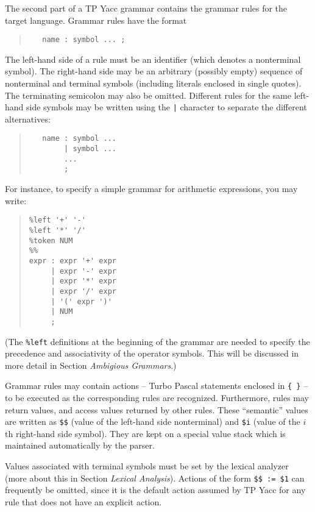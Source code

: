 The second part of a TP Yacc grammar contains the grammar rules for the
target language. Grammar rules have the format

\begin{quote}\begin{verbatim}
   name : symbol ... ;
\end{verbatim}\end{quote}

The left-hand side of a rule must be an identifier (which denotes a
nonterminal symbol). The right-hand side may be an arbitrary (possibly
empty) sequence of nonterminal and terminal symbols (including literals
enclosed in single quotes). The terminating semicolon may also be omitted.
Different rules for the same left-hand side symbols may be written using
the \verb"|" character to separate the different alternatives:

\begin{quote}\begin{verbatim}
   name : symbol ...
        | symbol ...
        ...
        ;
\end{verbatim}\end{quote}

For instance, to specify a simple grammar for arithmetic expressions, you
may write:

\begin{quote}\begin{verbatim}
%left '+' '-'
%left '*' '/'
%token NUM
%%
expr : expr '+' expr
     | expr '-' expr
     | expr '*' expr
     | expr '/' expr
     | '(' expr ')'
     | NUM
     ;
\end{verbatim}\end{quote}

(The \verb"%left" definitions at the beginning of the grammar are needed to
specify the precedence and associativity of the operator symbols. This will be
discussed in more detail in Section {\em Ambigious Grammars\/}.)

Grammar rules may contain actions -- Turbo Pascal statements enclosed in
\verb"{ }" -- to be executed as the corresponding rules are recognized.
Furthermore, rules may return values, and access values returned by other
rules. These ``semantic'' values are written as \verb"$$" (value of the
left-hand side nonterminal) and \verb"$i" (value of the $i$th right-hand
side symbol). They are kept on a special value stack which is maintained
automatically by the parser.

Values associated with terminal symbols must be set by the lexical analyzer
(more about this in Section {\em Lexical Analysis\/}). Actions of the form
\verb"$$ := $1" can frequently be omitted, since it is the default action
assumed by TP Yacc for any rule that does not have an explicit action.

